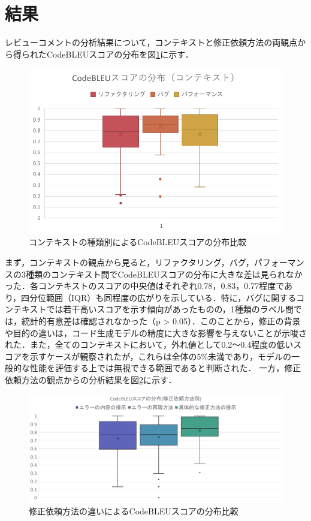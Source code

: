 \documentclass[11pt]{jreport}
\begin{document}
\section{結果}
レビューコメントの分析結果について，コンテキストと修正依頼方法の両観点から得られたCodeBLEUスコアの分布を図\ref{fig:context-score}に示す．
\begin{figure}[htbp]
\centering
\includegraphics[width=0.8\linewidth]{@BSthesis2024_Akamatsu/Akamatsu_figs/rq1_result02.pdf}
\caption{コンテキストの種類別によるCodeBLEUスコアの分布比較}
\label{fig:context-score}
\end{figure}
まず，コンテキストの観点から見ると，リファクタリング，バグ，パフォーマンスの3種類のコンテキスト間でCodeBLEUスコアの分布に大きな差は見られなかった．各コンテキストのスコアの中央値はそれぞれ0.78，0.83，0.77程度であり，四分位範囲（IQR）も同程度の広がりを示している．特に，バグに関するコンテキストでは若干高いスコアを示す傾向があったものの，1種類のラベル間では，統計的有意差は確認されなかった（p > 0.05）．このことから，修正の背景や目的の違いは，コード生成モデルの精度に大きな影響を与えないことが示唆された．また，全てのコンテキストにおいて，外れ値として0.2〜0.4程度の低いスコアを示すケースが観察されたが，これらは全体の5\%未満であり，モデルの一般的な性能を評価する上では無視できる範囲であると判断された．
一方，修正依頼方法の観点からの分析結果を図\ref{fig:method-score}に示す．
\begin{figure}[htbp]
\centering
\includegraphics[width=0.8\linewidth]{@BSthesis2024_Akamatsu/Akamatsu_figs/rq1_result03.pdf}
\caption{修正依頼方法の違いによるCodeBLEUスコアの分布比較}
\label{fig:method-score}
\end{figure}
\end{document}
